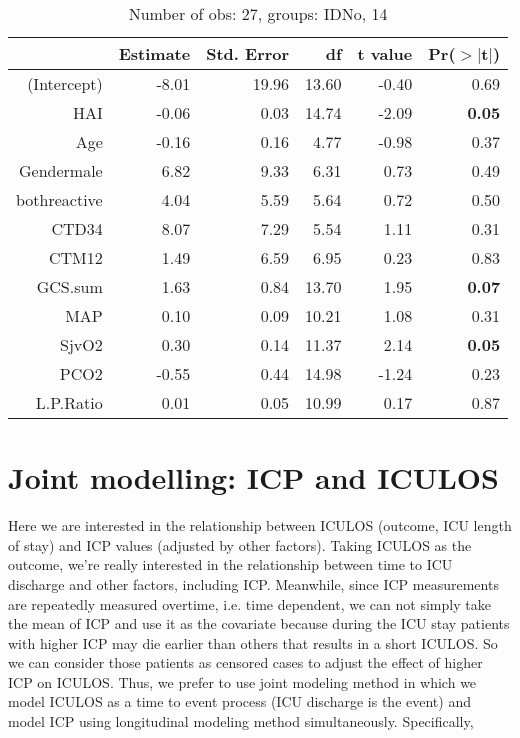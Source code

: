 \documentclass{article}
\begin{document}
\begin{table}[H]
\centering
\begin{tabular}{rrrrrr}
  \hline
 & Estimate & Std. Error & df & t value & Pr($>$$|$t$|$) \\ 
  \hline
(Intercept) & -8.01 & 19.96 & 13.60 & -0.40 & 0.69 \\ 
  HAI & -0.06 & 0.03 & 14.74 & -2.09 & {\bf 0.05} \\ 
  Age & -0.16 & 0.16 & 4.77 & -0.98 & 0.37 \\ 
  Gendermale & 6.82 & 9.33 & 6.31 & 0.73 & 0.49 \\ 
  bothreactive & 4.04 & 5.59 & 5.64 & 0.72 & 0.50 \\ 
  CTD34 & 8.07 & 7.29 & 5.54 & 1.11 & 0.31 \\ 
  CTM12 & 1.49 & 6.59 & 6.95 & 0.23 & 0.83 \\ 
  GCS.sum & 1.63 & 0.84 & 13.70 & 1.95 & {\bf 0.07} \\ 
  MAP & 0.10 & 0.09 & 10.21 & 1.08 & 0.31 \\ 
  SjvO2 & 0.30 & 0.14 & 11.37 & 2.14 & {\bf 0.05} \\ 
  PCO2 & -0.55 & 0.44 & 14.98 & -1.24 & 0.23 \\ 
  L.P.Ratio & 0.01 & 0.05 & 10.99 & 0.17 & 0.87 \\ 
   \hline
\end{tabular}
\caption{Number of obs: 27, groups: IDNo, 14}
\label{tab: lmm4}
\end{table}


\newpage
\section{Joint modelling: ICP and ICULOS}
Here we are interested in the relationship between ICULOS (outcome, ICU length of stay) and ICP values (adjusted by other factors). Taking ICULOS as the outcome, we're really interested in the relationship between time to ICU discharge and other factors, including ICP. Meanwhile, since ICP measurements are repeatedly measured overtime, i.e. time dependent, we can not simply take the mean of ICP and use it as the covariate because during the ICU stay patients with higher ICP may die earlier than others that results in a short ICULOS. So we can consider those patients as censored cases to adjust the effect of higher ICP on ICULOS. Thus, we prefer to use joint modeling method \cite{henderson2000joint} in which we model ICULOS as a time to event process (ICU discharge is the event) and model ICP using longitudinal modeling method simultaneously. Specifically, 
\end{document}
